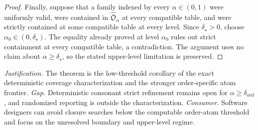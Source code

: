 \documentclass{article}
\begin{document}
\begin{proof}
Finally, suppose that a family indexed by every \(\alpha\in(0,1)\) were uniformly valid, were contained in \(\widehat{\mathfrak O}_\alpha\) at every compatible table, and were strictly contained at some compatible table at every level. Since \(\delta_\star>0\), choose \(\alpha_0\in(0,\delta_\star)\). The equality already proved at level \(\alpha_0\) rules out strict containment at every compatible table, a contradiction. The argument uses no claim about \(\alpha\ge\delta_\star\), so the stated upper-level limitation is preserved.
\end{proof}
\par\smallskip\noindent \textit{Justification.} The theorem is the low-threshold corollary of the exact deterministic coverage characterization and the stronger order-specific atom frontier. \textit{Gap.} Deterministic consonant strict refinement remains open for \(\alpha\ge\delta_{\mathrm{ord}}\), and randomized reporting is outside the characterization. \textit{Consumer.} Software designers can avoid closure searches below the computable order-atom threshold and focus on the unresolved boundary and upper-level regime.
\end{document}
